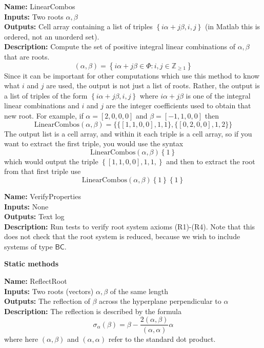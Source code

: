 \documentclass[12pt]{article}
\theoremstyle{definition}
\numberwithin{theorem}{subsection}
\newcommand{\Z}{\mathbb{Z}}
\newcommand{\sig}{\sigma}
\newcommand{\lb}{\left\{}
\newcommand{\rb}{\right\}}
\newcommand{\tbf}{\textbf}
\newcommand{\noi}{\noindent}
\begin{document}
\begin{framed}
\noi \tbf{Name:} LinearCombos \\
\noi \tbf{Inputs:} Two roots $\alpha, \beta$ \\
\noi \tbf{Outputs:} Cell array containing a list of triples $\lb i \alpha + j \beta, i, j \rb$ (in Matlab this is ordered, not an unorderd set). \\
\noi \tbf{Description:} Compute the set of positive integral linear combinations of $\alpha, \beta$ that are roots.
\[
	(\alpha, \beta) = \lb i\alpha + j\beta \in \Phi : i,j \in \Z_{\ge 1} \rb
\]
Since it can be important for other computations which use this method to know what $i$ and $j$ are used, the output is not just a list of roots. Rather, the output is a list of triples of the form $\lb i\alpha + j\beta, i,j \rb$ where $i\alpha + j\beta$ is one of the integral linear combinations and $i$ and $j$ are the integer coefficients used to obtain that new root. For example, if $\alpha = [2, 0, 0, 0]$ and $\beta = [-1, 1, 0, 0]$ then
\[
	\text{LinearCombos}(\alpha, \beta) = \Big\{ \big\{ [1, 1, 0, 0],1,1 \big\}, \big\{ [0,2,0,0],1,2 \big\} \Big\}
\]
The output list is a cell array, and within it each triple is a cell array, so if you want to extract the first triple, you would use the syntax
\[
	\text{LinearCombos}(\alpha,\beta) \lb 1 \rb 
\]
which would output the triple $\lb [1,1,0,0], 1,1, \rb$ and then to extract the root from that first triple use
\[
	\text{LinearCombos}(\alpha,\beta) \lb 1 \rb \lb 1 \rb
\]
\end{framed}

\begin{framed}
\noi \tbf{Name:} VerifyProperties \\
\noi \tbf{Inputs:} None \\
\noi \tbf{Outputs:} Text log \\
\noi \tbf{Description:} Run tests to verify root system axioms (R1)-(R4). Note that this does not check that the root system is reduced, because we wish to include systems of type $\mathsf{BC}$.
\end{framed}

\begin{center}
\tbf{Static methods}
\end{center}

\begin{framed}
\noi \tbf{Name:} ReflectRoot \\
\noi \tbf{Inputs:} Two roots (vectors) $\alpha, \beta$ of the same length \\
\noi \tbf{Outputs:} The reflection of $\beta$ across the hyperplane perpendicular to $\alpha$ \\
\noi \tbf{Description:} The reflection is described by the formula
\[
	\sig_\alpha(\beta) = \beta - \frac{2( \alpha, \beta)}{(\alpha, \alpha)} \alpha
\]
where here $(\alpha, \beta)$ and $(\alpha, \alpha)$ refer to the standard dot product.
\end{framed}
\end{document}
